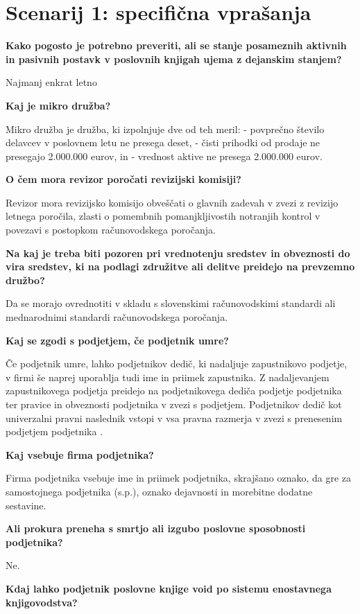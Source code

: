 \documentclass[a4paper,12pt,openright]{book}
\begin{document}
\section*{Scenarij 1: specifična vprašanja}

\textbf{Kako pogosto je potrebno preveriti, ali se stanje posameznih aktivnih in pasivnih postavk v poslovnih knjigah ujema z dejanskim stanjem?}

Najmanj enkrat letno

\textbf{Kaj je mikro družba?}

Mikro družba je družba, ki izpolnjuje dve od teh meril:
- povprečno število delavcev v poslovnem letu ne presega deset,
- čisti prihodki od prodaje ne presegajo 2.000.000 eurov, in
- vrednost aktive ne presega 2.000.000 eurov.

\textbf{O čem mora revizor poročati revizijski komisiji?}

Revizor mora revizijsko komisijo obveščati o glavnih zadevah v zvezi z revizijo letnega poročila, zlasti o pomembnih pomanjkljivostih notranjih kontrol v povezavi s postopkom računovodskega poročanja.

\textbf{Na kaj je treba biti pozoren pri vrednotenju sredstev in obveznosti do vira sredstev, ki na podlagi združitve ali delitve preidejo na prevzemno družbo?}

Da se morajo ovrednotiti v skladu s slovenskimi računovodskimi standardi ali mednarodnimi standardi računovodskega poročanja.

\textbf{Kaj se zgodi s podjetjem, če podjetnik umre?}

Če podjetnik umre, lahko podjetnikov dedič, ki nadaljuje zapustnikovo podjetje, v ﬁrmi še naprej uporablja tudi ime in priimek zapustnika. Z nadaljevanjem zapustnikovega podjetja preidejo na podjetnikovega dediča podjetje podjetnika ter pravice in obveznosti podjetnika v zvezi s podjetjem. Podjetnikov dedič kot univerzalni pravni naslednik vstopi v vsa pravna razmerja v zvezi s prenesenim podjetjem podjetnika .

\textbf{Kaj vsebuje firma podjetnika?}

Firma podjetnika vsebuje ime in priimek podjetnika, skrajšano oznako, da gre za samostojnega podjetnika (s.p.), oznako dejavnosti in morebitne dodatne sestavine.

\textbf{Ali prokura preneha s smrtjo ali izgubo poslovne sposobnosti podjetnika?}

Ne.

\textbf{Kdaj lahko podjetnik poslovne knjige void po sistemu enostavnega knjigovodstva?}
\end{document}
